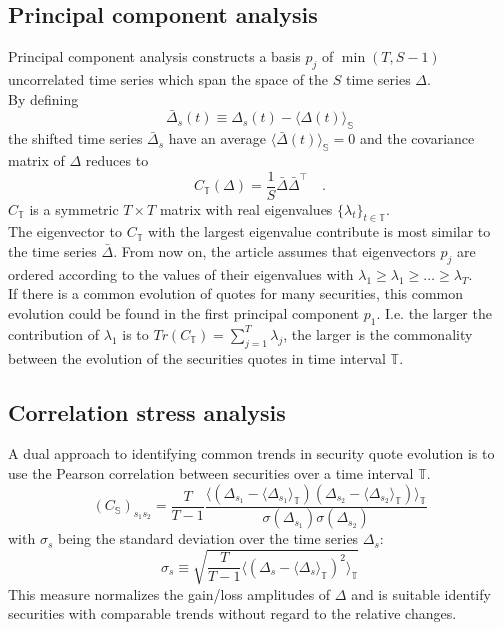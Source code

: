 \documentclass[11pt,twoside,a4paper]{article}
\begin{document}
\subsection{Principal component analysis}
Principal component analysis constructs a basis $p_j$ of $\min(T,S-1)$ uncorrelated time series which span the space of the $S$ time series $\Delta$.\\
By defining
\begin{equation}
\bar{\Delta}_s(t)\equiv\Delta_s(t)-\langle\Delta(t)\rangle_\mathbb{S}
\end{equation}
the shifted time series $\bar{\Delta}_s$ have an average $\langle\bar{\Delta}(t)\rangle_\mathbb{S}=0$ and the covariance matrix of $\Delta$ reduces to
\begin{equation}
C_\mathbb{T}(\Delta)=\frac{1}{S}\bar{\Delta}\bar{\Delta}^\top\quad.
\end{equation}
$C_\mathbb{T}$ is a symmetric $T\times T$ matrix with real eigenvalues $\{\lambda_t\}_{t\in\mathbb{T}}$.\\
The eigenvector to $C_\mathbb{T}$  with the largest eigenvalue contribute is most similar to the time series $\bar{\Delta}$. From now on, the article assumes that eigenvectors $p_j$ are ordered according to the values of their eigenvalues with ${\lambda_1\geq\lambda_1\geq\ldots\geq\lambda_T}$.\\
If there is a common evolution of quotes for many securities, this common evolution could be found in the first principal component $p_1$. I.e. the larger the contribution of $\lambda_1$ is to $Tr(C_\mathbb{T})=\sum_{j=1}^T\lambda_j$, the larger is the commonality between the evolution of the securities quotes in time interval $\mathbb{T}$.
\subsection{Correlation stress analysis}
A dual approach to identifying common trends in security quote evolution is to use the Pearson correlation between securities over a time interval $\mathbb{T}$.
\begin{equation}
\left(C_\mathbb{S}\right)_{s_1s_2}=\frac{T}{T-1}\frac{\langle\left(\Delta_{s_1}-\langle\Delta_{s_1}\rangle_\mathbb{T}\right)\left(\Delta_{s_2}-\langle\Delta_{s_2}\rangle_\mathbb{T}\right)\rangle_\mathbb{T}}{\sigma(\Delta_{s_1})\sigma(\Delta_{s_2})}
\end{equation}
with $\sigma_s$ being the standard deviation over the time series $\Delta_s$:
\begin{equation}
\sigma_s \equiv \sqrt{\frac{T}{T-1}\langle\left(\Delta_{s}-\langle\Delta_{s}\rangle_\mathbb{T}\right)^2\rangle_\mathbb{T}}
\end{equation}
This measure normalizes the gain/loss amplitudes of $\Delta$ and is suitable identify securities with comparable trends without regard to the relative changes.\\
\end{document}
